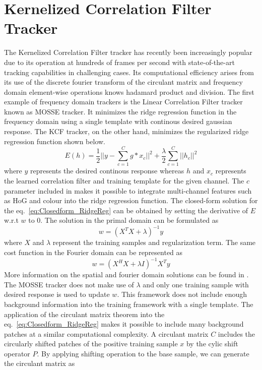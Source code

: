 \documentclass[10pt,twocolumn,letterpaper]{article}
\begin{document}
\section{Kernelized Correlation Filter Tracker}
\label{KCF}
The Kernelized Correlation Filter tracker has recently been increasingly popular due to its operation at hundreds of frames per second with state-of-the-art tracking capabilities in
challenging cases. Its computational efficiency arises from its use of the discrete fourier transform of the circulant matrix and frequency domain element-wise operations knows hadamard product and division. The first example of frequency domain trackers is the Linear Correlation Filter tracker known as MOSSE tracker. It minimizes the ridge regression function
in the frequency domain using a single template with continous desired gaussian response. The KCF tracker, on the other hand, minimizes the regularized ridge regression function shown below. 
\begin{equation}
E(h) = \frac{1}{2}||y-\sum_{c=1}^{C}g*x_{c}||^{2} + \frac{\lambda}{2}\sum_{c=1}^{C}||h_{c}||^{2}
\label{eq:Closedform_RidgeReg}
\end{equation}
where $y$ represents the desired continous response whereas $h$ and $x_{c}$ represents the learned correlation filter and training template for the given channel. The $c$ parameter included in \cite{henriques2015high,galoogahi2013multi} makes it possible to integrate multi-channel features such as HoG and colour into the ridge regression function. The closed-form solution for the eq.~\ref{eq:Closedform_RidgeReg} can be obtained by setting the derivative of $E$ w.r.t $w$ to $0$. The solution in the primal domain can be formulated as
\begin{equation}
w = (X^{T}X+\lambda)^{-1}y
\label{eq:SpatialSolution}
\end{equation}
where $X$ and $\lambda$ represent the training samples and regularization term. The same cost function in the Fourier domain can be represented as
\begin{equation}
w = (X^{H}X+\lambda I)^{-1}X^{T}y
\label{eq:FourierSolution}
\end{equation}
More information on the spatial and fourier domain solutions can be found in \cite{henriques2015high}. The MOSSE tracker does not make use of $\lambda$ and only one training sample with desired response is used to update $w$. This framework does not include enough background information into the training framework with a single template. The application of the circulant matrix theorem into the eq.~\ref{eq:Closedform_RidgeReg} makes it possible to include many background patches at a similar computational complexity. A circulant matrix $C$ includes the circularly shifted patches of the positive training sample $x$ by the cylic shift operator $P$. By applying shifting operation to the base sample, we can generate the circulant matrix as
\end{document}

